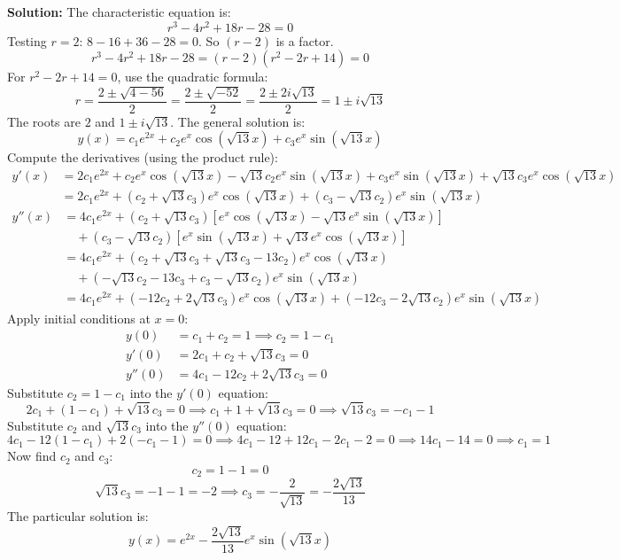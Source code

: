 \documentclass[11pt, a4paper]{article}
\theoremstyle{definition}
\theoremstyle{remark}
\begin{document}
\textbf{Solution:}
The characteristic equation is:
\[ r^3 - 4r^2 + 18r - 28 = 0 \]
Testing $r = 2$: $8 - 16 + 36 - 28 = 0$. So $(r - 2)$ is a factor.
\[ r^3 - 4r^2 + 18r - 28 = (r - 2)(r^2 - 2r + 14) = 0 \]
For $r^2 - 2r + 14 = 0$, use the quadratic formula:
\[ r = \frac{2 \pm \sqrt{4 - 56}}{2} = \frac{2 \pm \sqrt{-52}}{2} = \frac{2 \pm 2i\sqrt{13}}{2} = 1 \pm i\sqrt{13} \]
The roots are $2$ and $1 \pm i\sqrt{13}$. The general solution is:
\[ y(x) = c_1 e^{2x} + c_2 e^x \cos(\sqrt{13}x) + c_3 e^x \sin(\sqrt{13}x) \]
Compute the derivatives (using the product rule):
\begin{align*}
    y'(x) &= 2c_1 e^{2x} + c_2 e^x \cos(\sqrt{13}x) - \sqrt{13}c_2 e^x \sin(\sqrt{13}x) + c_3 e^x \sin(\sqrt{13}x) + \sqrt{13}c_3 e^x \cos(\sqrt{13}x) \\
    &= 2c_1 e^{2x} + (c_2 + \sqrt{13}c_3)e^x \cos(\sqrt{13}x) + (c_3 - \sqrt{13}c_2)e^x \sin(\sqrt{13}x)
\end{align*}
\begin{align*}
    y''(x) &= 4c_1 e^{2x} + (c_2 + \sqrt{13}c_3)[e^x \cos(\sqrt{13}x) - \sqrt{13}e^x \sin(\sqrt{13}x)] \\
    &\quad + (c_3 - \sqrt{13}c_2)[e^x \sin(\sqrt{13}x) + \sqrt{13}e^x \cos(\sqrt{13}x)] \\
    &= 4c_1 e^{2x} + (c_2 + \sqrt{13}c_3 + \sqrt{13}c_3 - 13c_2)e^x \cos(\sqrt{13}x) \\
    &\quad + (-\sqrt{13}c_2 - 13c_3 + c_3 - \sqrt{13}c_2)e^x \sin(\sqrt{13}x) \\
    &= 4c_1 e^{2x} + (-12c_2 + 2\sqrt{13}c_3)e^x \cos(\sqrt{13}x) + (-12c_3 - 2\sqrt{13}c_2)e^x \sin(\sqrt{13}x)
\end{align*}
Apply initial conditions at $x = 0$:
\begin{align*}
    y(0) &= c_1 + c_2 = 1 \implies c_2 = 1 - c_1 \\
    y'(0) &= 2c_1 + c_2 + \sqrt{13}c_3 = 0 \\
    y''(0) &= 4c_1 - 12c_2 + 2\sqrt{13}c_3 = 0
\end{align*}
Substitute $c_2 = 1 - c_1$ into the $y'(0)$ equation:
\[ 2c_1 + (1 - c_1) + \sqrt{13}c_3 = 0 \implies c_1 + 1 + \sqrt{13}c_3 = 0 \implies \sqrt{13}c_3 = -c_1 - 1 \]
Substitute $c_2$ and $\sqrt{13}c_3$ into the $y''(0)$ equation:
\[ 4c_1 - 12(1 - c_1) + 2(-c_1 - 1) = 0 \implies 4c_1 - 12 + 12c_1 - 2c_1 - 2 = 0 \implies 14c_1 - 14 = 0 \implies c_1 = 1 \]
Now find $c_2$ and $c_3$:
\[ c_2 = 1 - 1 = 0 \]
\[ \sqrt{13}c_3 = -1 - 1 = -2 \implies c_3 = -\frac{2}{\sqrt{13}} = -\frac{2\sqrt{13}}{13} \]
The particular solution is:
\[ y(x) = e^{2x} - \frac{2\sqrt{13}}{13} e^x \sin(\sqrt{13}x) \]
\end{document}
